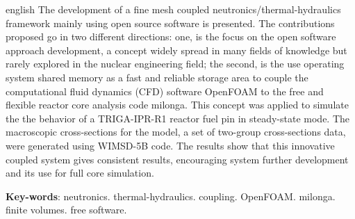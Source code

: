 \documentclass[12pt,openright,twoside,a4paper,english,french,spanish,brazil]{abntex2}
\begin{document}
\begin{resumo}[Abstract]
 \begin{otherlanguage*}{english}
   The development of a fine mesh coupled neutronics/thermal-hydraulics framework mainly using open source software is presented.
   The contributions proposed go in two different directions: one, is the focus on the open software approach development, a concept
   widely spread in many fields of knowledge but rarely explored in the nuclear engineering field; the second, is the use operating
   system shared memory as a fast and reliable storage area to couple the computational fluid dynamics (CFD) software OpenFOAM to the
   free and flexible reactor core analysis code milonga. This concept was applied to simulate the the behavior of a TRIGA-IPR-R1 reactor
   fuel pin in steady-state mode. The macroscopic cross-sections for the model, a set of two-group cross-sections data, were generated using WIMSD-5B code.
   The results show that this innovative coupled system gives consistent results, encouraging system further development and its use for full core simulation.
   
   \vspace{\onelineskip}
% 
   \noindent 
   \textbf{Key-words}: neutronics. thermal-hydraulics. coupling. OpenFOAM. milonga. finite volumes. free software.
 \end{otherlanguage*}
\end{resumo}

% 
% 

%  
% 



\listoffigures*
\cleardoublepage
\end{document}
